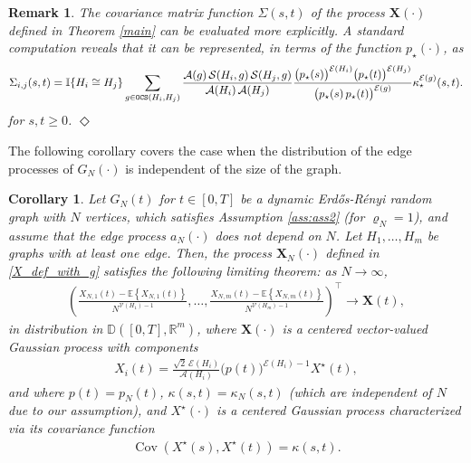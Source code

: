 \documentclass[11pt,reqno]{amsart}
\numberwithin{equation}{section}
\newcommand{\E}[1]{\mathbb{E}\left\{ #1\right\}}
\newcommand{\R}{\mathbb{R}}
\newtheorem{korr}[theo]{Corollary}
\newtheorem{remark}[theo]{Remark}
\newcommand{\netheo}[1]{{Theorem \ref{#1}}}
\newcommand{\kb}[1]{\boldsymbol{#1}}
\newcommand{\vk}[1]{\kb{#1}}
\begin{document}
{

\begin{remark}{\em
    The covariance matrix function $\Sigma(s,t)$ of the process $\vk X(\cdot)$ defined in \netheo{main} can be evaluated more explicitly. A standard computation reveals that it can be represented, in terms of the function $p_\star(\cdot)$, as 
    \begin{align*}
        \Sigma_{i,j}(s,t) = \mathbb{I}\{{H}_i\cong {H}_j\}\sum_{g\in{\tt OCS}({H}_i,{H}_j)}\frac{\mathcal{A}(g)\,\mathcal{S}({H}_i,g)\,\mathcal{S}({H}_j,g)}{\mathcal{A}({H}_i)\,\mathcal{A}({H}_j)}\frac{\bigl(p_{\star}(s)\bigr)^{\mathcal{E}({H}_i)}\bigl(p_{\star}(t)\bigr)^{\mathcal{E}({H}_j)}}{\bigl(p_{\star}(s)\,p_{\star}(t)\bigr)^{\mathcal{E}(g)}}\kappa^{\mathcal{E}(g)}_{\star}(s,t).
    \end{align*}
    for $s,t\geqslant 0$.}
   \hfill ${\Diamond}$
\end{remark}

{The following corollary covers the case when the distribution of the edge processes of $G_N({\cdot})$ is independent of the size of the graph.}

\begin{korr}\label{main_corr}
     Let $G_N(t)$ for $t\in[0,T]$ be a dynamic Erd\H{o}s-R\'{e}nyi random graph with $N$ vertices, {which satisfies  Assumption \ref{ass:ass2} (for $\varrho_N = 1$), and assume that the edge process $a_{N}(\cdot)$ does not depend on $N$.} {Let}  $H_1,\ldots, H_{m}$ be  graphs with at least one edge. Then, the process $\vk X_N(\cdot)$ defined in \eqref{X_def_with_g} satisfies the following limiting theorem: as $N\to\infty$,
    \begin{align*}
        \left(\frac{X_{N,1}(t) - \E{X_{N,1}(t)}}{N^{\mathcal{V}(H_1)-1}},\ldots,\frac{X_{N,m}(t) - \E{X_{N,m}(t)}}{N^{\mathcal{V}(H_m)-1}}\right)^{\top}\to \vk X(t),
    \end{align*}
    in distribution in $\mathbb{D}([0,T],\R^{m})$, where {$\vk X(\cdot)$} is a centered vector-valued Gaussian process with components
    \begin{align*}
        X_i(t) =\frac{\sqrt{2}\,\mathcal{E}(H_i)}{\mathcal{A}({H}_i)}\bigl(p(t)\bigr)^{\mathcal{E}({H}_i) - 1}X^{\star}(t),
    \end{align*}
    and where $p(t) = p_N(t)$, $\kappa(s,t) = \kappa_N(s,t)$ (which are independent of $N$ due to our assumption), and {$X^{\star}(\cdot)$} is a centered Gaussian process characterized via its covariance function
    \begin{align*}
        \operatorname{Cov}(X^{\star}(s),X^{\star}(t)) = \kappa(s,t).
    \end{align*}
\end{korr}

}
\end{document}
